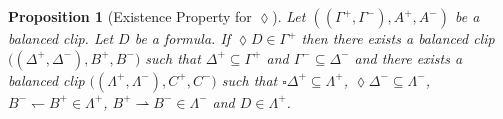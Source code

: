 \documentclass[10pt,a4paper]{amsart}
\newtheorem{proposition}{Proposition}
\begin{document}
\begin{proposition}[Existence Property for $\lozenge$]\label{Proposition:let:be:a:balanced:clip:let:be:a:formula:if:then:for:all:balanced:clips:if:and:then:there:exists:a:balanced:clip:such:that:and:1:lozenge:Gamma:plus}
%
%
Let $((\Gamma^{+},\Gamma^{-}),A^{+},A^{-})$ be a balanced clip.
Let $D$ be a formula.
If ${\lozenge}D{\in}\Gamma^{+}$ then there exists a balanced clip $((\Delta^{+},\Delta^{-}),B^{+},
%
%
%
%
%
%
%
$\linebreak$
%
%
%
%
%
%
B^{-})$ such that $\Delta^{+}{\subseteq}\Gamma^{+}$ and $\Gamma^{-}{\subseteq}\Delta^{-}$ and there exists a balanced clip $((\Lambda^{+},\Lambda^{-}),C^{+},
%
%
%
%
%
%
%
$\linebreak$
%
%
%
%
%
%
C^{-})$ such that ${\square}\Delta^{+}{\subseteq}\Lambda^{+}$, ${\lozenge}\Delta^{-}{\subseteq}\Lambda^{-}$, $B^{-}{\leftharpoondown}B^{+}{\in}\Lambda^{+}$, $B^{+}{\rightharpoonup}B^{-}{\in}\Lambda^{-}$ and $D{\in}\Lambda^{+}$.
%
%
\end{proposition}
\end{document}
